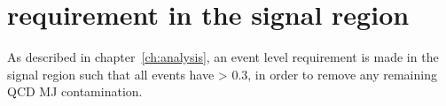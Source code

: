 \chapter{\mindphistar requirement in the signal region}
\label{ch:app_dphistar}

As described in chapter~\ref{ch:analysis}, an event level requirement is made in
the
signal region such that all events have \mindphistar > 0.3, in order to remove
any remaining QCD MJ contamination. 




